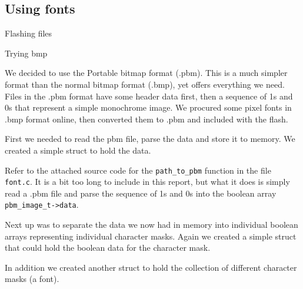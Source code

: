 \subsection{Using fonts}

Flashing files

Trying bmp

We decided to use the Portable bitmap format (.pbm).
This is a much simpler format than the normal bitmap format (.bmp),
yet offers everything we need.
Files in the .pbm format have some header data first, then a sequence of 1s and 0s that represent a simple monochrome image.
We procured some pixel fonts in .bmp format online, then converted them to .pbm and included with the flash.

First we needed to read the pbm file, parse the data and store it to memory.
We created a simple struct to hold the data.



Refer to the attached source code for the \texttt{path\_to\_pbm} function in the file \texttt{font.c}.
It is a bit too long to include in this report, but what it does is simply read a .pbm file and parse the sequence of 1s and 0s into the boolean array \texttt{pbm\_image\_t->data}.

Next up was to separate the data we now had in memory into individual boolean arrays representing individual character masks.
Again we created a simple struct that could hold the boolean data for the character mask.



In addition we created another struct to hold the collection of different character masks (a font).




